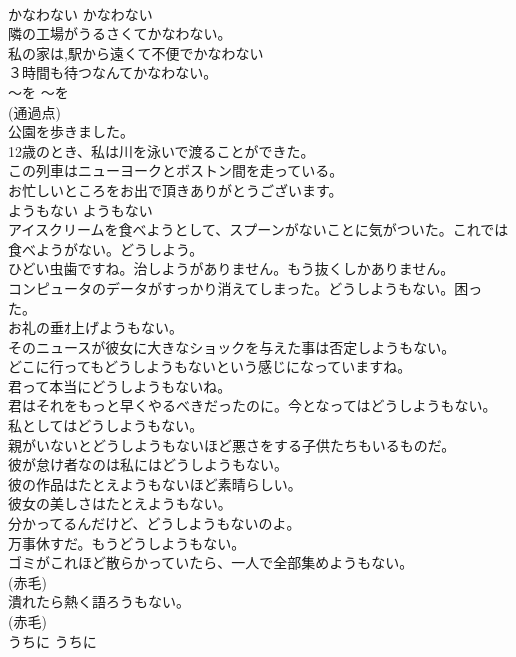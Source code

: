 \documentclass[8pt]{extreport}
\begin{document}
\begin{CJK}{UTF8}{min}
\\	かなわない	かなわない	
\\	隣の工場がうるさくてかなわない。   
\\	私の家は,駅から遠くて不便でかなわない   
\\	３時間も待つなんてかなわない。  
\\	〜を	〜を	
\\	(通過点)	
\\	公園を歩きました。  
\\	12歳のとき、私は川を泳いで渡ることができた。  
\\	この列車はニューヨークとボストン間を走っている。  
\\	お忙しいところをお出で頂きありがとうございます。  
\\	ようもない	ようもない	
\\	アイスクリームを食べようとして、スプーンがないことに気がついた。これでは食べようがない。どうしよう。  
\\	ひどい虫歯ですね。治しようがありません。もう抜くしかありません。  
\\	コンピュータのデータがすっかり消えてしまった。どうしようもない。困った。  
\\	お礼の垂ｵ上げようもない。  
\\	そのニュースが彼女に大きなショックを与えた事は否定しようもない。   
\\	どこに行ってもどうしようもないという感じになっていますね。   
\\	君って本当にどうしようもないね。   
\\	君はそれをもっと早くやるべきだったのに。今となってはどうしようもない。   
\\	私としてはどうしようもない。   
\\	親がいないとどうしようもないほど悪さをする子供たちもいるものだ。   
\\	彼が怠け者なのは私にはどうしようもない。   
\\	彼の作品はたとえようもないほど素晴らしい。   
\\	彼女の美しさはたとえようもない。   
\\	分かってるんだけど、どうしようもないのよ。   
\\	万事休すだ。もうどうしようもない。   
\\	ゴミがこれほど散らかっていたら、一人で全部集めようもない。  
\\	(赤毛)
\\	潰れたら熱く語ろうもない。  
\\	(赤毛)
\\	うちに	うちに	

\end{CJK}
\end{document}
